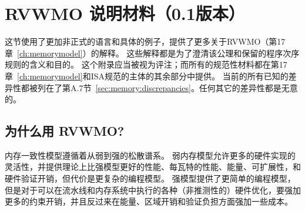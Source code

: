 \makeatletter
\gdef\SetFigFont#1#2#3#4#5{%
  \reset@font\fontsize{12}{#2pt}%
  \fontfamily{\sfdefault}\fontseries{#4}\fontshape{#5}%
  \selectfont}
\makeatother

\chapter{RVWMO 说明材料（0.1版本）}
\label{sec:memorymodelexplanation}
这节使用了更加非正式的语言和具体的例子，提供了更多关于RVWMO（第17章~\ref{ch:memorymodel}）的解释。
这些解释都是为了澄清该公理和保留的程序次序规则的含义和目的。
这个附录应当被视为评注；而所有的规范性材料都在第17章~\ref{ch:memorymodel}和ISA规范的主体的其余部分中提供。
当前的所有已知的差异性都被列在了第A.7节~\ref{sec:memory:discrepancies}。任何其它的差异性都是无意的。

\section{为什么用 RVWMO?}
\label{sec:whyrvwmo}

内存一致性模型遵循着从弱到强的松散谱系。
弱内存模型允许更多的硬件实现的灵活性，并提供理论上比强模型更好的性能、每瓦特的性能、能量、可扩展性，和硬件验证开销，但代价是更复杂的编程模型。
强模型提供了更简单的编程模型，但是对于可以在流水线和内存系统中执行的各种（非推测性的）硬件优化，要强加更多的约束开销，并且反过来在能量、区域开销和验证负担方面强加一些成本。

